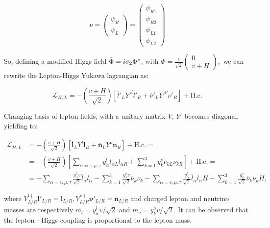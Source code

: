\begin{equation*}
    \nu =  
\begin{pmatrix}
   \psi_R \\ \psi_L
\end{pmatrix} = 
\begin{pmatrix}
   \psi_{R1} \\ \psi_{R2} \\ \psi_{L1} \\ \psi_{L2}
\end{pmatrix}
\end{equation*}

So, defining a modified Higgs field $\Tilde{\Phi} = i\sigma_2 \Phi^*$, with $\Phi = \frac{1}{\sqrt{2}} \begin{pmatrix}
        0 \\ v + H
    \end{pmatrix},$
we can rewrite the Lepton-Higgs Yukawa lagrangian as: 

\begin{equation}
\label{yuk_L}
    \mathcal{L}_{H,L} = -\left(\frac{v+H}{\sqrt{2}}\right)\left[\overline{l}'_LY'^ll'_R + \overline{\nu}'_LY'^\nu\nu'_R\right] + \text{H.c.}
\end{equation}

Changing basis of lepton fields, with a unitary matrix $V$, $Y'$ becomes diagonal, yielding to: 

\begin{equation}
\label{yuk_L_mass}
    \begin{aligned}
    \mathcal{L}_{H,L} & = -\left(\frac{v+H}{\sqrt{2}}\right)\left[\overline{\bm{l}}_LY^l\bm{l}_R + \overline{\bm{n}}_LY^\nu \bm{n}_R\right] + \text{H.c.} = \\ & = -\left(\frac{v+H}{\sqrt{2}}\right)\left[\sum_{\alpha = e,\mu,\tau}y^l_\alpha\overline{l}_{\alpha L}l_{\alpha R} + \sum_{k = 1}^3 y^\nu_k\overline{\nu}_{kL}\nu_{kR}\right] + \text{H.c.} = \\
    & = - \sum_{\alpha = e, \mu, \tau} \frac{y^l_\alpha v}{\sqrt{2}} \overline{l}_\alpha l_\alpha - \sum_{k=1}^3 \frac{y^\nu_k v}{\sqrt{2}} \overline{\nu}_k \nu_k - \sum_{\alpha = e, \mu, \tau} \frac{y^l_\alpha}{\sqrt{2}} \overline{l}_\alpha l_\alpha H - \sum_{k=1}^3 \frac{y^\nu_k}{\sqrt{2}} \overline{\nu}_k \nu_k H,
    \end{aligned}
\end{equation}

where $V^{l\dag}_{L/R} \bm{l}'_{L/R} = \bm{l}_{L/R}, V^{\nu \dag}_{L/R}\bm{\nu}'_{L/R} = \bm{n}_{L/R}$ and charged lepton and neutrino masses are respectively $m_l = y^l_\alpha v/\sqrt{2}$ and $m_\nu = y^\nu_k v/\sqrt{2}$. It can be observed that the lepton - Higgs coupling is proportional to the lepton mass. 

